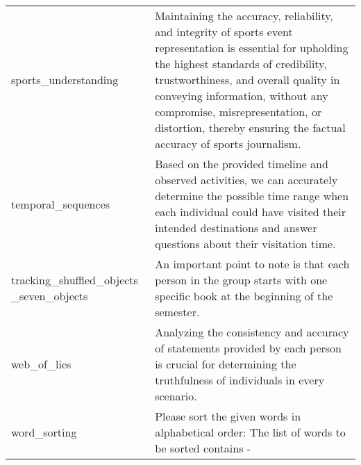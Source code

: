 \begin{table}[H]
\begin{tabular}{P{2.3cm}P{11.6cm}}
sports\_understanding & Maintaining the accuracy, reliability, and integrity of sports event representation is essential for upholding the highest standards of credibility, trustworthiness, and overall quality in conveying information, without any compromise, misrepresentation, or distortion, thereby ensuring the factual accuracy of sports journalism. \\ [2ex]
temporal\_sequences & Based on the provided timeline and observed activities, we can accurately determine the possible time range when each individual could have visited their intended destinations and answer questions about their visitation time. \\ [2ex]
tracking\_shuffled\_objects \_seven\_objects & An important point to note is that each person in the group starts with one specific book at the beginning of the semester. \\ [2ex]
web\_of\_lies & Analyzing the consistency and accuracy of statements provided by each person is crucial for determining the truthfulness of individuals in every scenario. \\ [2ex]
word\_sorting & Please sort the given words in alphabetical order: The list of words to be sorted contains - \\ [2ex]

\bottomrule
\end{tabular}
\label{table:found_instructions_on_bbh_tasks_s_palm_2_l_o_gpt_3.5_turbo_from_empty}
\end{table}

